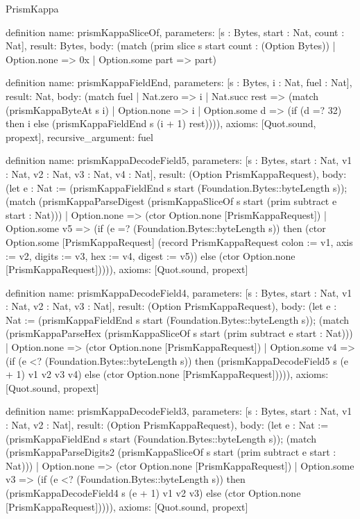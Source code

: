 \begin{lexlean}{PrismKappa}
\begin{semanticmodule}
definition{
  name: prismKappaSliceOf,
  parameters: [s : Bytes, start : Nat, count : Nat],
  result: Bytes,
  body: (match (prim slice s start count : (Option Bytes))
    | Option.none => 0x
    | Option.some part => part)
}

definition{
  name: prismKappaFieldEnd,
  parameters: [s : Bytes, i : Nat, fuel : Nat],
  result: Nat,
  body: (match fuel
    | Nat.zero => i
    | Nat.succ rest => (match (prismKappaByteAt s i)
      | Option.none => i
      | Option.some d => (if (d =? 32) then i else (prismKappaFieldEnd s (i + 1) rest)))),
  axioms: [Quot.sound, propext],
  recursive_argument: fuel
}

definition{
  name: prismKappaDecodeField5,
  parameters: [s : Bytes, start : Nat, v1 : Nat, v2 : Nat, v3 : Nat, v4 : Nat],
  result: (Option PrismKappaRequest),
  body: (let e : Nat := (prismKappaFieldEnd s start (Foundation.Bytes::byteLength s)); (match (prismKappaParseDigest (prismKappaSliceOf s start (prim subtract e start : Nat)))
    | Option.none => (ctor Option.none [PrismKappaRequest])
    | Option.some v5 => (if (e =? (Foundation.Bytes::byteLength s)) then (ctor Option.some [PrismKappaRequest] (record PrismKappaRequest {colon := v1, axis := v2, digits := v3, hex := v4, digest := v5})) else (ctor Option.none [PrismKappaRequest])))),
  axioms: [Quot.sound, propext]
}

definition{
  name: prismKappaDecodeField4,
  parameters: [s : Bytes, start : Nat, v1 : Nat, v2 : Nat, v3 : Nat],
  result: (Option PrismKappaRequest),
  body: (let e : Nat := (prismKappaFieldEnd s start (Foundation.Bytes::byteLength s)); (match (prismKappaParseHex (prismKappaSliceOf s start (prim subtract e start : Nat)))
    | Option.none => (ctor Option.none [PrismKappaRequest])
    | Option.some v4 => (if (e <? (Foundation.Bytes::byteLength s)) then (prismKappaDecodeField5 s (e + 1) v1 v2 v3 v4) else (ctor Option.none [PrismKappaRequest])))),
  axioms: [Quot.sound, propext]
}

definition{
  name: prismKappaDecodeField3,
  parameters: [s : Bytes, start : Nat, v1 : Nat, v2 : Nat],
  result: (Option PrismKappaRequest),
  body: (let e : Nat := (prismKappaFieldEnd s start (Foundation.Bytes::byteLength s)); (match (prismKappaParseDigits2 (prismKappaSliceOf s start (prim subtract e start : Nat)))
    | Option.none => (ctor Option.none [PrismKappaRequest])
    | Option.some v3 => (if (e <? (Foundation.Bytes::byteLength s)) then (prismKappaDecodeField4 s (e + 1) v1 v2 v3) else (ctor Option.none [PrismKappaRequest])))),
  axioms: [Quot.sound, propext]
}


\end{semanticmodule}
\end{lexlean}
